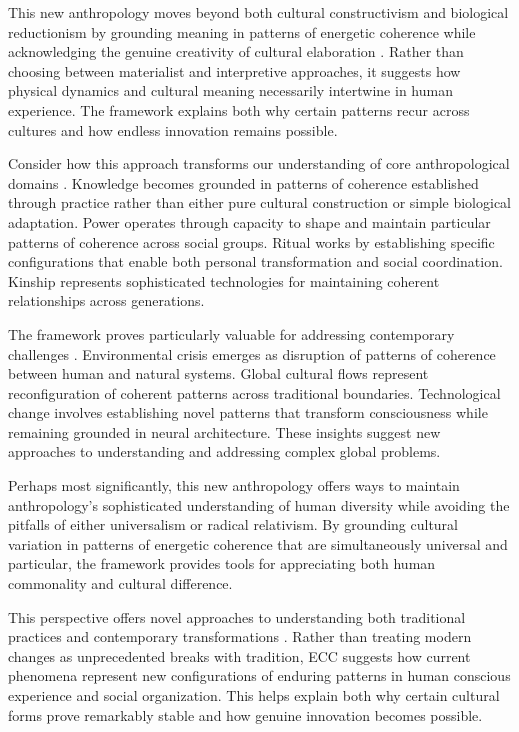 This new anthropology moves beyond both cultural constructivism and biological reductionism by grounding meaning in patterns of energetic coherence while acknowledging the genuine creativity of cultural elaboration \cite{strathern2004commons}. Rather than choosing between materialist and interpretive approaches, it suggests how physical dynamics and cultural meaning necessarily intertwine in human experience. The framework explains both why certain patterns recur across cultures and how endless innovation remains possible.

Consider how this approach transforms our understanding of core anthropological domains \cite{fischer2018anthropology}. Knowledge becomes grounded in patterns of coherence established through practice rather than either pure cultural construction or simple biological adaptation. Power operates through capacity to shape and maintain particular patterns of coherence across social groups. Ritual works by establishing specific configurations that enable both personal transformation and social coordination. Kinship represents sophisticated technologies for maintaining coherent relationships across generations.

The framework proves particularly valuable for addressing contemporary challenges \cite{latour2017facing}. Environmental crisis emerges as disruption of patterns of coherence between human and natural systems. Global cultural flows represent reconfiguration of coherent patterns across traditional boundaries. Technological change involves establishing novel patterns that transform consciousness while remaining grounded in neural architecture. These insights suggest new approaches to understanding and addressing complex global problems.

Perhaps most significantly, this new anthropology offers ways to maintain anthropology's sophisticated understanding of human diversity \cite{moore2011still} while avoiding the pitfalls of either universalism or radical relativism. By grounding cultural variation in patterns of energetic coherence that are simultaneously universal and particular, the framework provides tools for appreciating both human commonality and cultural difference.

This perspective offers novel approaches to understanding both traditional practices and contemporary transformations \cite{tsing2015mushroom}. Rather than treating modern changes as unprecedented breaks with tradition, ECC suggests how current phenomena represent new configurations of enduring patterns in human conscious experience and social organization. This helps explain both why certain cultural forms prove remarkably stable and how genuine innovation becomes possible.

